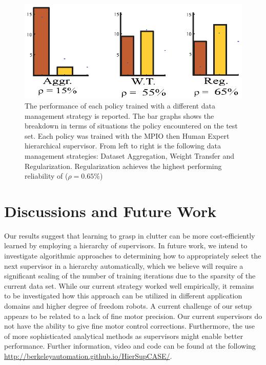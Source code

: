 \documentclass[10pt, conference]{ieeeconf}      %
\begin{document}
\begin{figure}[t]
\centering 
\includegraphics{f_figs/cost_result.eps}

\caption{\footnotesize The performance of each policy trained with a different data management strategy is reported. The
bar graphs shows the breakdown in terms of situations the policy encountered on the test set. Each policy was trained
with the MPIO then Human Expert hierarchical supervisor. From left to right is the following data management strategies: Dataset Aggregation, Weight Transfer and Regularization. Regularization achieves the highest performing reliability of ($\rho = 0.65\%$) }
\label{fig:cost_result}
\end{figure}

\section{Discussions and Future Work}
Our results suggest that learning to grasp in clutter can be more cost-efficiently learned by employing a hierarchy of
supervisors. In future work, we intend to investigate algorithmic approaches to determining how to appropriately select
the next supervisor in a hierarchy automatically, which we believe will require a significant scaling of the number of
training iterations due to the sparsity of the current data set. While our current strategy worked well empirically, it remains to be 
investigated how this approach can be utilized in different application domains and higher degree of freedom robots.
A current challenge of our setup appears to be related to a lack of fine motor precision. 
Our current supervisors do not have the ability to give fine motor control corrections. Furthermore, the use of more
sophisticated analytical methods as supervisors might enable better performance. 
Further information, video and code can be found at the following \url{http://berkeleyautomation.github.io/HierSupCASE/}. 
\end{document}
